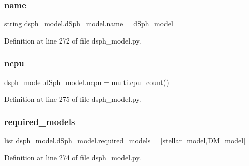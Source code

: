 \subsubsection{\texorpdfstring{name}{name}}
{\footnotesize\ttfamily string dsph\+\_\+model.\+d\+Sph\+\_\+model.\+name = \textquotesingle{}\hyperlink{classdsph__model_1_1dSph__model}{d\+Sph\+\_\+model}\textquotesingle{}\hspace{0.3cm}{\ttfamily [static]}}



Definition at line 272 of file dsph\+\_\+model.\+py.

\mbox{\label{classdsph__model_1_1dSph__model_ab09f579bff6269075f5956a1c0a88bdc}} 
\subsubsection{\texorpdfstring{ncpu}{ncpu}}
{\footnotesize\ttfamily dsph\+\_\+model.\+d\+Sph\+\_\+model.\+ncpu = multi.\+cpu\+\_\+count()\hspace{0.3cm}{\ttfamily [static]}}



Definition at line 275 of file dsph\+\_\+model.\+py.

\mbox{\label{classdsph__model_1_1dSph__model_a7795b8e9d3d0dbf3cd5a4d618c30a6c0}} 
\subsubsection{\texorpdfstring{required\+\_\+models}{required\_models}}
{\footnotesize\ttfamily list dsph\+\_\+model.\+d\+Sph\+\_\+model.\+required\+\_\+models = \mbox{[}\hyperlink{classdsph__model_1_1stellar__model}{stellar\+\_\+model},\hyperlink{classdsph__model_1_1DM__model}{D\+M\+\_\+model}\mbox{]}\hspace{0.3cm}{\ttfamily [static]}}



Definition at line 274 of file dsph\+\_\+model.\+py.

